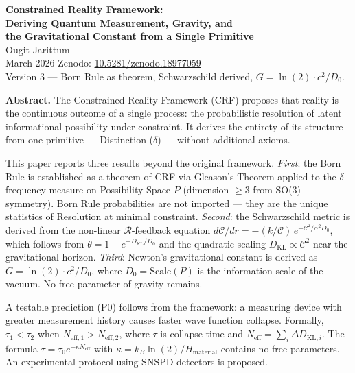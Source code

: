 \documentclass[12pt]{article}
\begin{document}
\begin{center}
{\LARGE\bfseries\color{navyblue}
Constrained Reality Framework:}\\[0.5em]
{\Large\bfseries\color{navyblue}
Deriving Quantum Measurement, Gravity, and\\
the Gravitational Constant from a Single Primitive}\\[0.7em]
{\normalsize Ougit Jarittum}\\[0.3em]
{\small\color{mutedgray} March 2026 \quad
Zenodo: \href{https://doi.org/10.5281/zenodo.18977059}
{10.5281/zenodo.18977059}}\\[0.4em]
{\small\color{mutedgray} Version 3 ---
Born Rule as theorem, Schwarzschild derived,
$G = \ln(2)\cdot c^2/D_0$.}
\end{center}

\bigskip

\noindent\textbf{Abstract.}
The Constrained Reality Framework (CRF) proposes that reality is the
continuous outcome of a single process: the probabilistic resolution of
latent informational possibility under constraint. It derives the
entirety of its structure from one primitive --- Distinction ($\delta$)
--- without additional axioms.

This paper reports three results beyond the original framework.
\textit{First}: the Born Rule is established as a theorem of CRF via
Gleason's Theorem applied to the $\delta$-frequency measure on
Possibility Space $P$ (dimension $\geq 3$ from SO(3) symmetry). Born
Rule probabilities are not imported --- they are the unique statistics
of Resolution at minimal constraint.
\textit{Second}: the Schwarzschild metric is derived from the
non-linear $\mathcal{R}$-feedback equation
$d\mathcal{C}/dr = -(k/\mathcal{C})\,e^{-\mathcal{C}^2/\alpha^2 D_0}$,
which follows from $\theta = 1 - e^{-D_{\mathrm{KL}}/D_0}$ and the
quadratic scaling $D_{\mathrm{KL}} \propto \mathcal{C}^2$ near the
gravitational horizon.
\textit{Third}: Newton's gravitational constant is derived as
$G = \ln(2)\cdot c^2/D_0$, where $D_0 = \mathrm{Scale}(P)$ is the
information-scale of the vacuum. No free parameter of gravity remains.

A testable prediction (P0) follows from the framework: a measuring
device with greater measurement history causes faster wave function
collapse. Formally, $\tau_1 < \tau_2$ when $N_{\mathrm{eff},1} >
N_{\mathrm{eff},2}$, where $\tau$ is collapse time and
$N_{\mathrm{eff}} = \sum_i \Delta D_{\mathrm{KL},i}$. The formula
$\tau = \tau_0 e^{-\kappa N_{\mathrm{eff}}}$ with
$\kappa = k_B\ln(2)/H_{\mathrm{material}}$ contains no free
parameters. An experimental protocol using SNSPD detectors is
proposed.
\end{document}
